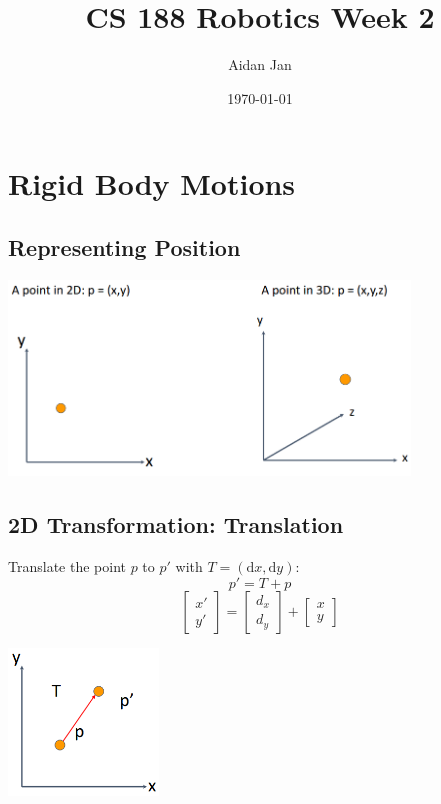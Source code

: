 \documentclass[10pt]{article}
\title{CS 188 Robotics Week 2}
\author{Aidan Jan}
\date{\today}
\newcommand{\dd}{\text{d}}
\begin{document}
\maketitle 

\section*{Rigid Body Motions}

\subsection*{Representing Position}
\begin{center} 
	\includegraphics*[width=0.8\textwidth]{L1_1.png} 
\end{center}

\subsection*{2D Transformation: Translation}
Translate the point $p$ to $p'$ with $T = (\dd x, \dd y)$:
\[p' = T + p\]
\[\begin{bmatrix} x' \\ y' \end{bmatrix} = \begin{bmatrix} d_x \\ d_y \end{bmatrix} + \begin{bmatrix} x \\ y \end{bmatrix}\]
\begin{center} 
	\includegraphics*[width=0.3\textwidth]{L1_2.png} 
\end{center}
\end{document}
